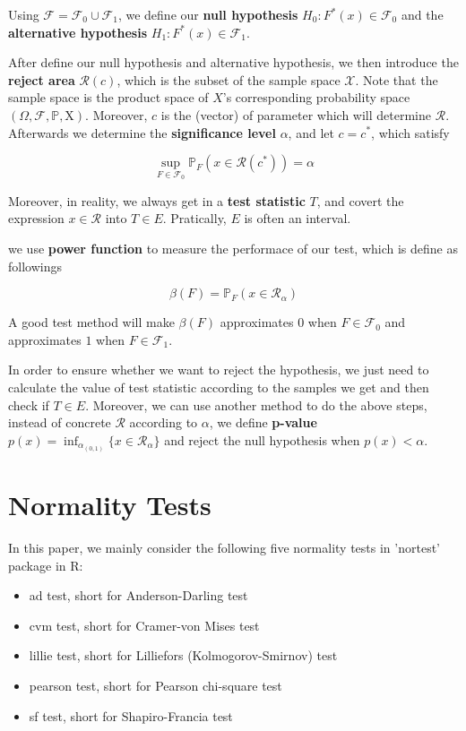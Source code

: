 \documentclass[twoside]{article}
\begin{document}
Using $\mathcal{F} = \mathcal{F}_0 \cup \mathcal{F}_1$, we define our \textbf{null hypothesis} $H_0: F^*(x) \in \mathcal{F}_0$ and the \textbf{alternative hypothesis} $H_1: F^*(x) \in \mathcal{F}_1$.

After define our null hypothesis and alternative hypothesis, we then introduce the \textbf{reject area} $\mathscr{R}(c)$, which is the subset of the sample space $\mathscr{X}$. Note that the sample space is the product space of $X$'s corresponding probability space $(\Omega, \mathscr{F}, \mathbb{P}, \mathrm{X})$. Moreover, $c$ is the (vector) of parameter which will determine $\mathscr{R}$. Afterwards we determine the \textbf{significance level} $\alpha$, and let $c=c^*$, which satisfy

$$\sup_{F\in\mathcal{F}_0}{\mathbb{P}_F(x \in \mathscr{R}(c^*))}=\alpha$$

Moreover, in reality, we always get in a \textbf{test statistic} $T$, and covert the expression $x \in \mathscr{R}$ into $T \in E$. Pratically, $E$ is often an interval.

we use \textbf{power function} to measure the performace of our test, which is define as followings

$$\beta(F)=\mathbb{P}_F(x\in\mathscr{R}_\alpha)$$

A good test method will make $\beta(F)$ approximates $0$ when $F \in \mathcal{F}_0$ and approximates $1$ when $F \in \mathcal{F}_1$.

In order to ensure whether we want to reject the hypothesis, we just need to calculate the value of test statistic according to the samples we get and then check if $T \in E$. Moreover, we can use another method to do the above steps, instead of concrete $\mathscr{R}$ according to $\alpha$, we define \textbf{p-value} $p(x)=\inf_{\alpha_(0,1)}\{x \in \mathscr{R}_\alpha\}$ and reject the null hypothesis when $p(x) < \alpha$.

\section{Normality Tests}

In this paper, we mainly consider the following five normality tests in 'nortest' package in R:

\begin{itemize}
  \item ad test, short for Anderson-Darling test
  \item cvm test, short for Cramer-von Mises test
  \item lillie test, short for Lilliefors (Kolmogorov-Smirnov) test
  \item pearson test, short for Pearson chi-square test
  \item sf test, short for Shapiro-Francia test
\end{itemize}
\end{document}

